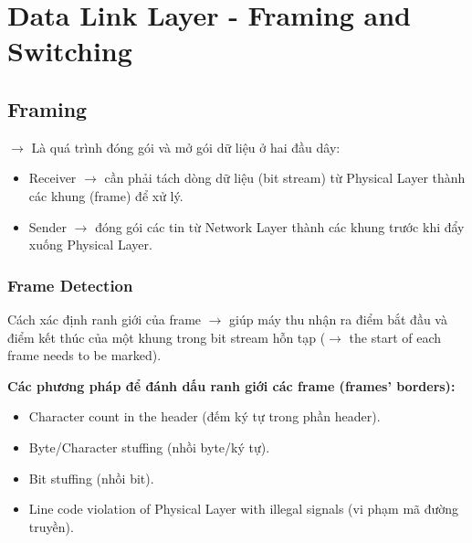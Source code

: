 \chapter{Data Link Layer - Framing and Switching}
\chapterminitoc

\section{Framing}

\noindent
$\rightarrow$ Là quá trình đóng gói và mở gói dữ liệu ở hai đầu dây:

\begin{itemize}
    \item Receiver $\rightarrow$ cần phải tách dòng dữ liệu (bit stream) từ Physical Layer thành các khung (frame) để xử lý.
    \item Sender $\rightarrow$ đóng gói các tin từ Network Layer thành các khung trước khi đẩy xuống Physical Layer.
\end{itemize}
\medskip

\noindent
{}

\subsection{Frame Detection}

\noindent
Cách xác định ranh giới của frame $\rightarrow$ giúp máy thu nhận ra điểm bắt đầu và điểm kết thúc của một khung trong bit stream hỗn tạp ($\rightarrow$ the start of each frame needs to be marked).
\medskip

\noindent
\textbf{Các phương pháp để đánh dấu ranh giới các frame (frames' borders):}

\begin{itemize}
    \item Character count in the header (đếm ký tự trong phần header).
    \item Byte/Character stuffing (nhồi byte/ký tự).
    \item Bit stuffing (nhồi bit).
    \item Line code violation of Physical Layer with illegal signals (vi phạm mã đường truyền).
\end{itemize}

